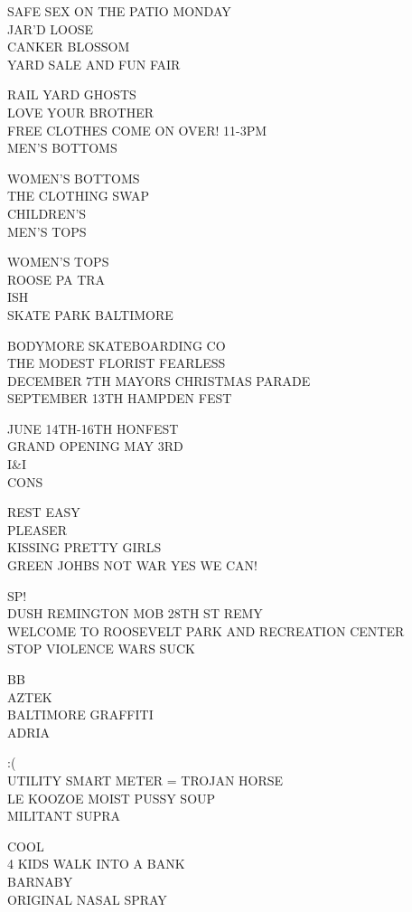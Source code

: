 \documentclass[10pt,letterpaper]{article}
\begin{document}
SAFE SEX ON THE PATIO MONDAY\\
JAR'D LOOSE\\
CANKER BLOSSOM\\
YARD SALE AND FUN FAIR

RAIL YARD GHOSTS\\
LOVE YOUR BROTHER\\
FREE CLOTHES COME ON OVER!  11{-}3PM\\
MEN'S BOTTOMS

WOMEN'S BOTTOMS\\
THE CLOTHING SWAP\\
CHILDREN'S\\
MEN'S TOPS

WOMEN'S TOPS\\
ROOSE PA TRA\\
ISH\\
SKATE PARK BALTIMORE

BODYMORE SKATEBOARDING CO\\
THE MODEST FLORIST FEARLESS\\
DECEMBER 7TH MAYORS CHRISTMAS PARADE\\
SEPTEMBER 13TH HAMPDEN FEST

JUNE 14TH{-}16TH HONFEST\\
GRAND OPENING MAY 3RD\\
I\&I\\
CONS

REST EASY\\
PLEASER\\
KISSING PRETTY GIRLS\\
GREEN JOHBS NOT WAR YES WE CAN!

SP!\\
DUSH REMINGTON MOB 28TH ST REMY\\
WELCOME TO ROOSEVELT PARK AND RECREATION CENTER\\
STOP VIOLENCE WARS SUCK

BB\\
AZTEK\\
BALTIMORE GRAFFITI\\
ADRIA

:(\\
UTILITY SMART METER = TROJAN HORSE\\
LE KOOZOE MOIST PUSSY SOUP\\
MILITANT SUPRA

COOL\\
4 KIDS WALK INTO A BANK\\
BARNABY\\
ORIGINAL NASAL SPRAY
\end{document}
